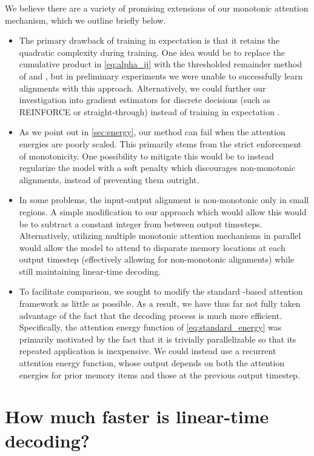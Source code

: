 \documentclass{article}
\begin{document}
We believe there are a variety of promising extensions of our monotonic attention mechanism, which we outline briefly below.
\begin{itemize}[leftmargin=*,topsep=0pt,itemsep=-1ex,partopsep=2ex,parsep=2ex]
\item The primary drawback of training in expectation is that it retains the quadratic complexity during training.
One idea would be to replace the cumulative product in \cref{eq:alpha_ij} with the thresholded remainder method of  and , but in preliminary experiments we were unable to successfully learn alignments with this approach.
Alternatively, we could further our investigation into gradient estimators for discrete decisions (such as REINFORCE or straight-through) instead of training in expectation .
\item As we point out in \cref{sec:energy}, our method can fail when the attention energies  are poorly scaled.
This primarily stems from the strict enforcement of monotonicity.
One possibility to mitigate this would be to instead regularize the model with a soft penalty which discourages non-monotonic alignments, instead of preventing them outright.
\item In some problems, the input-output alignment is non-monotonic only in small regions.
A simple modification to our approach which would allow this would be to subtract a constant integer from  between output timesteps.
Alternatively, utilizing multiple monotonic attention mechanisms in parallel would allow the model to attend to disparate memory locations at each output timestep (effectively allowing for non-monotonic alignments) while still maintaining linear-time decoding.
\item To facilitate comparison, we sought to modify the standard -based attention framework as little as possible.
As a result, we have thus far not fully taken advantage of the fact that the decoding process is much more efficient.
Specifically, the attention energy function of \cref{eq:standard_energy} was primarily motivated by the fact that it is trivially parallelizable so that its repeated application is inexpensive.
We could instead use a recurrent attention energy function, whose output depends on both the attention energies for prior memory items and those at the previous output timestep.
\end{itemize}

\section{How much faster is linear-time decoding?}
\label{sec:faster}
\end{document}
